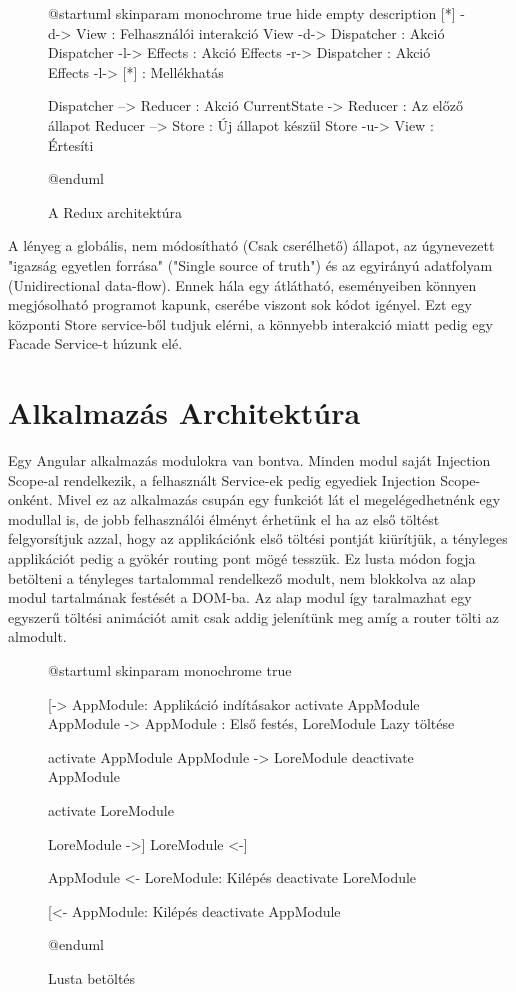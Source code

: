 \begin{figure}[h!]
	\centering
	\begin{plantuml}
		@startuml
		skinparam monochrome true
		hide empty description
		[*] -d-> View : Felhasználói interakció
		View -d-> Dispatcher : Akció
		Dispatcher -l-> Effects : Akció
		Effects -r-> Dispatcher : Akció
		Effects -l-> [*] : Mellékhatás

		Dispatcher --> Reducer : Akció
		CurrentState -> Reducer : Az előző állapot
		Reducer --> Store : Új állapot készül
		Store -u-> View : Értesíti

		@enduml
	\end{plantuml}
	\caption{A Redux architektúra}
	\label{fig:redux-architecture}
\end{figure}

A lényeg a globális, nem módosítható (Csak cserélhető) állapot, az úgynevezett "igazság egyetlen forrása" ("Single source of truth") és az egyirányú adatfolyam (Unidirectional data-flow). Ennek hála egy átlátható, eseményeiben könnyen megjósolható programot kapunk, cserébe viszont sok kódot igényel.
Ezt egy központi Store service-ből tudjuk elérni, a könnyebb interakció miatt pedig egy Facade\cite{Facade} Service-t húzunk elé.

\section{Alkalmazás Architektúra}

Egy Angular alkalmazás modulokra van bontva. Minden modul saját Injection Scope-al rendelkezik, a felhasznált Service-ek pedig egyediek Injection Scope-onként. Mivel ez az alkalmazás csupán egy funkciót lát el megelégedhetnénk egy modullal is, de jobb felhasználói élményt érhetünk el ha az első töltést felgyorsítjuk azzal, hogy az applikációnk első töltési pontját kiürítjük, a tényleges applikációt pedig a gyökér routing pont mögé tesszük. Ez lusta módon \cite{LazyLoad} fogja betölteni a tényleges tartalommal rendelkező modult, nem blokkolva az alap modul tartalmának festését a DOM-ba. Az alap modul így taralmazhat egy egyszerű töltési animációt amit csak addig jelenítünk meg amíg a router tölti az almodult.

\begin{figure}[h!]
	\centering
	\begin{plantuml}
		@startuml
		skinparam monochrome true

		[-> AppModule: Applikáció indításakor
		activate AppModule
		AppModule -> AppModule : Első festés, LoreModule Lazy töltése

		activate  AppModule
		AppModule -> LoreModule
		deactivate AppModule

		activate LoreModule

		LoreModule ->]
		LoreModule <-]


		AppModule <- LoreModule: Kilépés
		deactivate LoreModule

		[<- AppModule: Kilépés
		deactivate AppModule

		@enduml


	\end{plantuml}
	\caption{Lusta betöltés}
	\label{fig:lazy-loading}
\end{figure}

